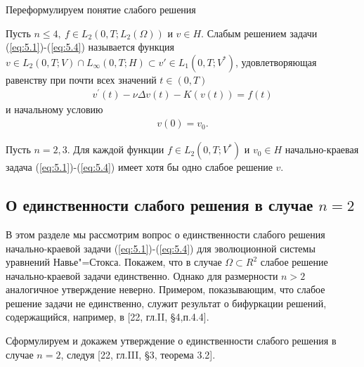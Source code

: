 Переформулируем понятие слабого решения
\begin{definition}
    Пусть $n \le 4, \ f \in L_2(0, T; L_2(\Omega))$ и $v \in H$. Слабым решением задачи (\ref{eq:5.1})-(\ref{eq:5.4}) называется функция
    $v \in L_2(0, T; V)\cap L_{\infty}(0,T;H)\subset v\prime\in L_1(0, T; V^\ast)$, удовлетворяющая равенству при почти всех значений $t \in (0, T)$
    \begin{equation}\label{eq:5.11}
        \begin{gathered}
            v^\prime(t) - \nu\Delta v(t) - K(v(t)) = f(t)
        \end{gathered}
    \end{equation}
      и начальному условию
    \begin{equation}\label{eq:5.12}
        \begin{gathered}
            v(0) = v_0.
        \end{gathered}
    \end{equation}
\end{definition}
\begin{theorem}
Пусть $n=2,3$. Для каждой функции $f\in L_2(0,T;V^\ast)$ и $v_0\in H$ начально-краевая задача (\ref{eq:5.1})-(\ref{eq:5.4})
имеет хотя бы одно слабое решение $v.$
\end{theorem}

\subsection {О единственности слабого решения в случае $n = 2$}
В этом разделе мы рассмотрим вопрос о единственности слабого решения начально-краевой задачи (\ref{eq:5.1})-(\ref{eq:5.4}) для эволюционной
системы уравнений Навье"=Стокса. Покажем, что в случае $\Omega \subset R^2$ слабое решение начально-краевой задачи единственно.
Однако для размерности $n > 2$ аналогичное утверждение неверно. Примером, показывающим, что слабое решение задачи не единственно, служит результат
о бифуркации решений, содержащийся, например, в [22, гл.II, \S 4,п.4.4].

Сформулируем и докажем утверждение о единственности слабого решения в случае $n = 2$, следуя [22, гл.III, \S 3, теорема 3.2].

